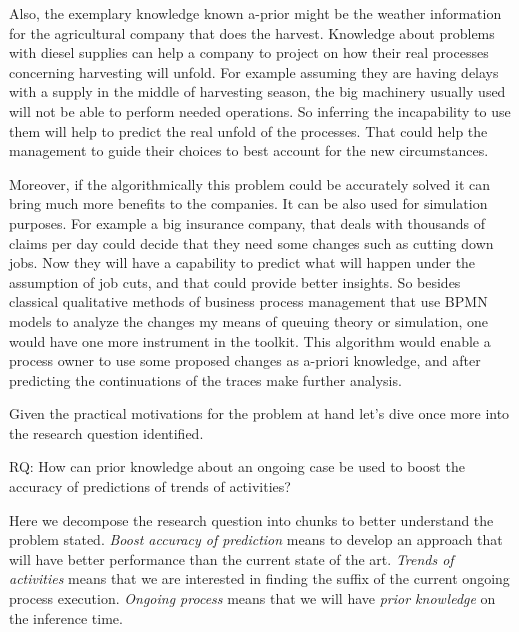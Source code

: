 Also, the exemplary knowledge known a-prior might be the weather information for the agricultural company that does the harvest. Knowledge about problems with diesel supplies can help a company to project on how their real processes concerning harvesting will unfold. For example assuming they are having delays with a supply in the middle of harvesting season, the big machinery usually used will not be able to perform needed operations. So inferring the incapability to use them will help to predict the real unfold of the processes. That could help the management to guide their choices to best account for the new circumstances. 


Moreover, if the algorithmically this problem could be accurately solved it can bring much more benefits to the companies. It can be also used for simulation purposes. For example a big insurance company, that deals with thousands of claims per day could decide that they need some changes such as cutting down jobs. Now they will have a capability to predict what will happen under the assumption of job cuts, and that could provide better insights. So besides classical qualitative methods of business process management that use BPMN models to analyze the changes my means of queuing theory or simulation, one would have one more instrument in the toolkit. This algorithm would enable a process owner to use some proposed changes as a-priori knowledge, and after predicting the continuations of the traces make further analysis. 

Given the practical motivations for the problem at hand let's dive once more into the research question identified.

RQ: How can prior knowledge about an ongoing case be used to boost the accuracy of predictions of trends of activities?

Here we decompose the research question into chunks to better understand the problem stated. \textit{Boost accuracy of prediction} means to develop an approach that will have better performance than the current state of the art. \textit{Trends of activities} means that we are interested in finding the suffix of the current ongoing process execution. \textit{Ongoing process} means that we will have \textit{prior knowledge} on the inference time. 






